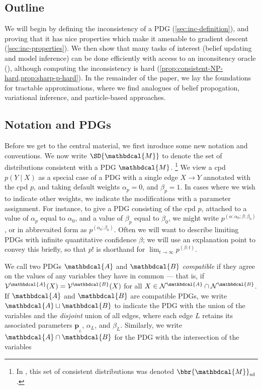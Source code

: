 \documentclass{article}
\theoremstyle{plain}
\theoremstyle{definition}
\theoremstyle{remark}
\newcommand\mat[1]{\mathbf{#1}}
\newcommand{\bp}[1][L]{\mat{p}_{\!_{#1}\!}}
\newcommand{\V}{\mathcal V}
\newcommand{\N}{\mathcal N}
\newcommand{\dg}[1]{\mathbdcal{#1}}
\newcommand{\bundle}{\mathbin{\sqcup}}
\begin{document}
\subsection*{Outline}
We will begin by defining the inconsistency of a PDG (\cref{sec:inc-definition}), and proving that it has nice properties which make it amenable to gradient descent (\cref{sec:inc-properties}). We then show that many tasks of interest (belief updating and model inference) can be done efficiently with access to an inconsitency oracle (), although computing the inconsistency is hard (\cref{prop:consistent-NP-hard,prop:sharp-p-hard}).
In the remainder of the paper, we lay the foundations for tractable approximations, where we find analogues of belief propogation, variational inference, and particle-based approaches.


\subsection*{Notation and PDGs}
Before we get to the central material, we first inroduce some new notation and conventions. We now write $\SD{\dg M}$ to denote
the set of distributions consistent with a PDG $\dg M$.%
	\footnote{In \cite{richardson2020probabilistic}, this set of consistent distributions was denoted $\bbr{\dg M}_{\textrm{sd}}$.}
We view a cpd $p(Y \mid X)$ as a special case of a PDG with
a single edge $X \to Y$ annotated with the cpd $p$, and taking
default weights $\alpha_p = 0$, and $\beta_p = 1$. In cases where we wish
to indicate other weights, we indicate the modifications with a parameter
assignment. For instance, to give a PDG consisting of the cpd $p$, attached to
a value of $\alpha_p$ equal to $\alpha_0$, and
a value of $\beta_p$ equal to $\beta_0$, we might write
$ p^{(\alpha:\alpha_0;\beta : \beta_0)} $, or in abbrevaited form as $p^{(\alpha_0;\beta_0)}$.
Often we will want to describe limiting PDGs with infinite quantitative confidence $\beta$; we will use an explanation point to convey this briefly, so that $p!$ is shorthand for
$\lim_{t \to \infty} p^{(\beta:t)}$.
%

We call two PDGs $\dg A$ and $\dg B$ \emph{compatible} if they agree
on the values of any variables they have in common --- that is, if
$\V^{\dg A}(X) = \V^{\dg B}(X)$ for all $X \in \N^{\dg A} \cap \N^{\dg B}$.
%
If $\dg A$ and $\dg B$ are compatible PDGs, we write $\dg A \bundle \dg B$ to indicate the PDG with the union of the variables and the \emph{disjoint} union of all edges, where each edge $L$ retains its associated parameters $\bp$, $\alpha_L$, and $\beta_L$.
Similarly, we write $\dg A \cap \dg B$ for the PDG with the intersection of the variables
\end{document}
